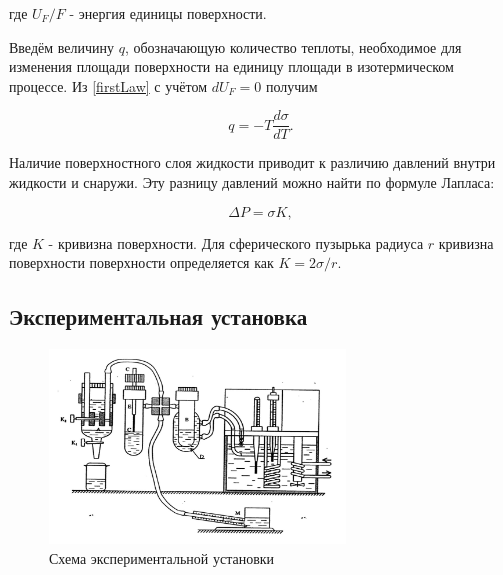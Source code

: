 \documentclass[a4paper,12pt]{article} %
\begin{document}
где $U_F/F$ - энергия единицы поверхности. 

Введём величину $q$, обозначающую количество теплоты, необходимое для изменения площади поверхности на единицу площади в изотермическом процессе. Из \eqref{firstLaw} с учётом $dU_F = 0$ получим

\begin{equation}
    q = -T\frac{d\sigma}{dT}.
    \label{qu}
\end{equation}

Наличие поверхностного слоя жидкости приводит к различию давлений внутри жидкости и снаружи. Эту разницу давлений можно найти по формуле Лапласа:

\begin{equation}
    \Delta P = \sigma K,
    \label{Laplass}
\end{equation}

где $K$ - кривизна поверхности. Для сферического пузырька радиуса $r$ кривизна поверхности поверхности определяется как $K = 2\sigma/r$.

\subsection{Экспериментальная установка}

\begin{figure}
    \centering
    \includegraphics[width = 0.7\textwidth]{setup.PNG}
    \caption{Схема экспериментальной установки}
    \label{fig:setup}
\end{figure}
\end{document}
